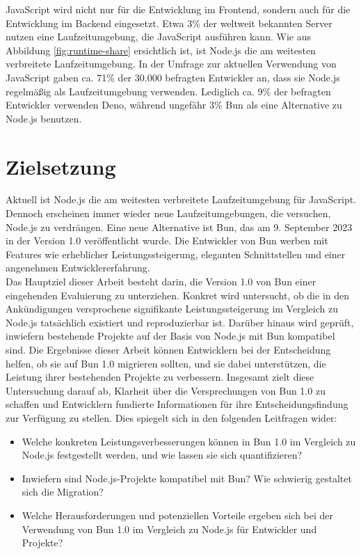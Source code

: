 \noindent
JavaScript wird nicht nur für die Entwicklung im Frontend, sondern auch für die Entwicklung im Backend 
eingesetzt. Etwa 3\% der weltweit bekannten Server nutzen eine Laufzeitumgebung, die JavaScript 
ausführen kann. \cite{QSuccess.2023} Wie aus Abbildung \ref{fig:runtime-share} ersichtlich ist, ist Node.js die am weitesten verbreitete Laufzeitumgebung. In der Umfrage zur aktuellen Verwendung von JavaScript gaben ca. 71\% der 30.000 befragten Entwickler an, dass sie Node.js regelmäßig als Laufzeitumgebung verwenden.
Lediglich ca. 9\% der befragten Entwickler verwenden Deno, während ungefähr 3\% Bun als eine Alternative zu Node.js benutzen. \cite{Greif.2022}


\section{Zielsetzung} \label{sec:introduction-target}
Aktuell ist Node.js die am weitesten verbreitete Laufzeitumgebung für JavaScript. Dennoch erscheinen immer wieder neue Laufzeitumgebungen, die versuchen, Node.js zu verdrängen. Eine neue Alternative ist Bun, das am 9. September 2023 in der Version 1.0 veröffentlicht wurde. Die Entwickler von Bun werben mit Features wie erheblicher Leistungssteigerung, eleganten Schnittstellen und einer angenehmen Entwicklererfahrung. \cite{Sumner.2023}\\

\noindent
Das Hauptziel dieser Arbeit besteht darin, die Version 1.0 von Bun einer eingehenden Evaluierung zu unterziehen. Konkret wird untersucht, ob die in den Ankündigungen versprochene signifikante Leistungssteigerung im Vergleich zu Node.js tatsächlich existiert und reproduzierbar ist. Darüber hinaus wird geprüft, inwiefern bestehende Projekte auf der Basis von Node.js mit Bun kompatibel sind. Die Ergebnisse dieser Arbeit können Entwicklern bei der Entscheidung helfen, ob sie auf Bun 1.0 migrieren sollten, und sie dabei unterstützen, die Leistung ihrer bestehenden Projekte zu verbessern. Insgesamt zielt diese Untersuchung darauf ab, Klarheit über die Versprechungen von Bun 1.0 zu schaffen und Entwicklern fundierte Informationen für ihre Entscheidungsfindung zur Verfügung zu stellen. Dies spiegelt sich in den folgenden Leitfragen wider:
\begin{itemize}
    \item Welche konkreten Leistungsverbesserungen können in Bun 1.0 im Vergleich zu Node.js festgestellt werden, und wie lassen sie sich quantifizieren?
    \item Inwiefern sind Node.js-Projekte kompatibel mit Bun? Wie schwierig gestaltet sich die Migration?
    \item Welche Herausforderungen und potenziellen Vorteile ergeben sich bei der Verwendung von Bun 1.0 im Vergleich zu Node.js für Entwickler und Projekte?
\end{itemize}

